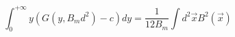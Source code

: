 \begin{equation}
\int_{0}^{+\infty} y(G(y,B_{m}d^{2})-c)dy=\frac{1}{12B_{m}}\int
d^{2}\vec{x} B^{2}(\vec{x})
\end{equation}

